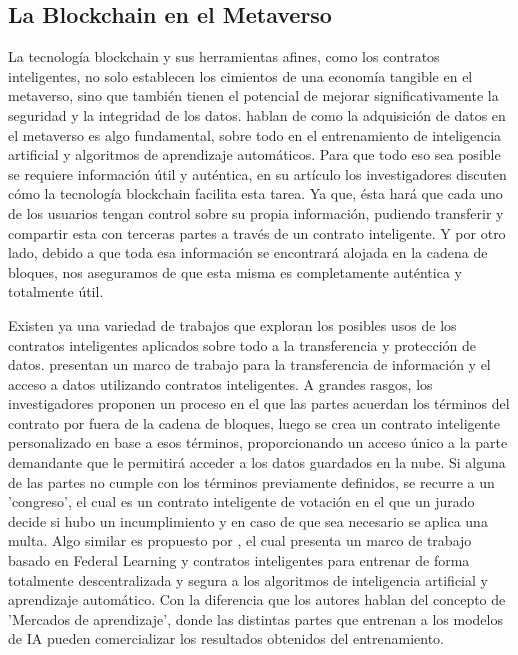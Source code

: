 \documentclass[a4paper,10pt]{article}
\begin{document}
	\subsection{La Blockchain en el Metaverso}
	La tecnología blockchain y sus herramientas afines, como los contratos inteligentes, no solo establecen los cimientos de una economía tangible en el metaverso, sino que también tienen el potencial de mejorar significativamente la seguridad y la integridad de los datos. \textcite{huynh2023blockchain} hablan de como la adquisición de datos en el metaverso es algo fundamental, sobre todo en el entrenamiento de inteligencia artificial y algoritmos de aprendizaje automáticos. Para que todo eso sea posible se requiere información útil y auténtica, en su artículo los investigadores discuten cómo la tecnología blockchain facilita esta tarea. Ya que, ésta hará que cada uno de los usuarios tengan control sobre su propia información, pudiendo transferir y compartir esta con terceras partes a través de un contrato inteligente. Y por otro lado, debido a que toda esa información se encontrará alojada en la cadena de bloques, nos aseguramos de que esta misma es completamente auténtica y totalmente útil. 
	
	Existen ya una variedad de trabajos que exploran los posibles usos de los contratos inteligentes aplicados sobre todo a la transferencia y protección de datos. \textcite{liu2018enforceable} presentan un marco de trabajo para la transferencia de información y el acceso a datos utilizando contratos inteligentes. A grandes rasgos, los investigadores proponen un proceso en el que las partes acuerdan los términos del contrato por fuera de la cadena de bloques, luego se crea un contrato inteligente personalizado en base a esos términos, proporcionando un acceso único a la parte demandante que le permitirá acceder a los datos guardados en la nube. Si alguna de las partes no cumple con los términos previamente definidos, se recurre a un 'congreso', el cual es un contrato inteligente de votación en el que un jurado decide si hubo un incumplimiento y en caso de que sea necesario se aplica una multa.
	Algo similar es propuesto por \textcite{ouyang2020learning}, el cual presenta un marco de trabajo basado en Federal Learning y contratos inteligentes para entrenar de forma totalmente descentralizada y segura a los algoritmos de inteligencia artificial y aprendizaje automático. Con la diferencia que los autores hablan del concepto de 'Mercados de aprendizaje', donde las distintas partes que entrenan a los modelos de IA pueden comercializar los resultados obtenidos del entrenamiento.
	
\end{document}
